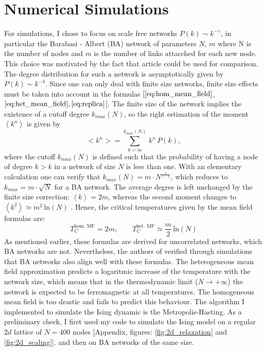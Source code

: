 \section{Numerical Simulations}
For simulations, I chose to focus on scale free networks $P(k) \sim k^{-\gamma}$, in particular the Barabasi - Albert (BA) network of parameters $N,\, m$ where N is the number of nodes and $m$ is the number of links attacched for each new node. This choice was motivated by the fact that article \cite{numeric_ising} could be used for comparison. The degree distribution for such a network is asymptotically given by $P(k) \sim k^{-3}$. Since one can only deal with finite size networks, finite size effects must be taken into account in the formulas $[\ref{eq:hom_mean_field}$, $\ref{eq:het_mean_field}, \ref{eq:replica}$].
The finite size of the network implies the existence of a cutoff degree $k_{max}(N)$, so the right estimation of the moment $\left\langle k^n \right \rangle$ is given by
\begin{equation*}
    <k^n> = \sum_{k=m}^{k_{max}(N)}\, k^n\,P(k),
\end{equation*}
where the cutoff $k_{max}(N)$ is defined such that the probability of having a node of degree $k>k$ in a network of size $N$ is less than one. With an elementary calculation one can verify that $k_{max}(N)= m\cdot N^{\frac{1}{\gamma -1}}$, which reduces to $k_{max} = m\cdot \sqrt{N}$ for a BA network.
The average degree is left unchanged by the finite size correction:  $\left \langle k \right \rangle = 2m$, whereas the second moment changes to $\left \langle k^2 \right \rangle \simeq m^2\,\text{ln}(N)$ \cite{analytical_ising}. Hence, the critical temperatures given by the mean field formulas are:
\begin{equation}
    T_C^{\text{hom. MF}} = 2m, \quad \quad T_C^{\text{het. MF}} \simeq \frac{m}{2}\,\text{ln}(N)
\end{equation}
As mentioned earlier, these formulas are derived for uncorrelated networks, which BA networks are not. Nevertheless, the authors of \cite{numeric_ising} verified through simulations that BA networks also align well with these formulas.
The heterogeneous mean field approximation predicts a logaritmic increase of the temperature with the network size, which means that in the thermodynamic limit ($N\rightarrow +\infty$) the network is expected to be ferromagnetic at all temperatures.
The homogeneous mean field is too drastic and fails to predict this behaviour. 
\bigskip \newline \noindent
The algorithm I implemented to simulate the Ising dynamic is the Metropolis-Hasting. As a preliminary check, I first used my code to simulate the Ising model on a regular $2d$ lattice of $N =400$ nodes [Appendix, figures: \ref{fig:2d_relaxation} and \ref{fig:2d_scaling}]. and then on BA networks of the same size.

